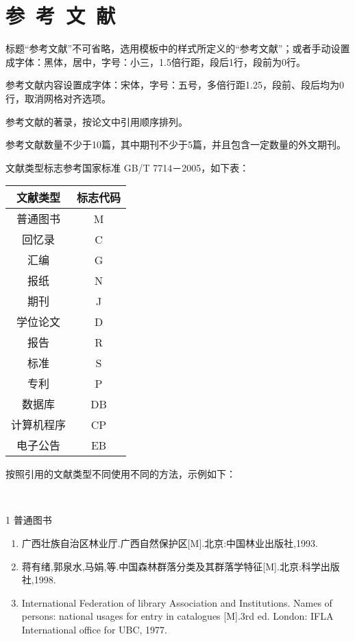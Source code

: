 \song\wuhao
\setmainfont{宋体}
\linespread{1.25}
\chapter*{\hfill 参~考~文~献 \hfill}
\label{reference}
标题“参考文献”不可省略，选用模板中的样式所定义的“参考文献”；或者手动设置成字体：黑体，居中，字号：小三，1.5倍行距，段后1行，段前为0行。

参考文献内容设置成字体：宋体，字号：五号，多倍行距1.25，段前、段后均为0行，取消网格对齐选项。

参考文献的著录，按论文中引用顺序排列。

参考文献数量不少于10篇，其中期刊不少于5篇，并且包含一定数量的外文期刊。

文献类型标志参考国家标准 GB/T 7714－2005，如下表：

\begin{table}[h]
	\centering
	\begin{tabular}{cc}
	\hline
	文献类型&标志代码\\
	\hline
	普通图书&M\\
	回忆录&C\\
	汇编&G\\
	报纸&N\\
	期刊&J\\
	学位论文&D\\
	报告&R\\
	标准&S\\
	专利&P\\
	数据库&DB\\
	计算机程序&CP\\
	电子公告&EB\\
	\hline
	\end{tabular}
\end{table}

按照引用的文献类型不同使用不同的方法，示例如下：

~\cite[p.~148]{.2019}
~\cite[p.~22]{master1}



1 普通图书
\begin{enumerate}
\item 广西壮族自治区林业厅.广西自然保护区[M].北京:中国林业出版社,1993.
\item 蒋有绪,郭泉水,马娟,等.中国森林群落分类及其群落学特征[M].北京:科学出版社,1998.
\item International Federation of library Association and Institutions. Names of persons: national usages for entry in catalogues [M].3rd ed. London: IFLA International office for UBC, 1977.
\end{enumerate}
\vspace{17.06pt}

